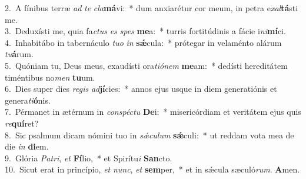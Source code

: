 {2.~}A fínibus terræ \textit{ad} \textit{te} \textit{cla}\textbf{má}vi:~* dum anxiarétur cor meum, in petra e\textit{xal}\textbf{tá}sti me.\\
{3.~}Deduxísti me, quia fa\textit{ctus} \textit{es} \textit{spes} \textbf{me}a:~* turris fortitúdinis a fácie i\textit{ni}\textbf{mí}ci.\\
{4.~}Inhabitábo in tabernáculo \textit{tu}\textit{o} \textit{in} \textbf{sǽ}cula:~* prótegar in velaménto alárum \textit{tu}\textbf{á}rum.\\
{5.~}Quóniam tu, Deus meus, exaudísti ora\textit{ti}\textit{ó}\textit{nem} \textbf{me}am:~* dedísti hereditátem timéntibus no\textit{men} \textbf{tu}um.\\
{6.~}Dies super dies \textit{re}\textit{gis} \textit{ad}\textbf{jí}cies:~* annos ejus usque in diem generatiónis et genera\textit{ti}\textbf{ó}nis.\\
{7.~}Pérmanet in ætérnum in \textit{con}\textit{spé}\textit{ctu} \textbf{De}i:~* misericórdiam et veritátem ejus quis \textit{re}\textbf{quí}ret?\\
{8.~}Sic psalmum dicam nómini tuo in \textit{sǽ}\textit{cu}\textit{lum} \textbf{sǽ}culi:~* ut reddam vota mea de die \textit{in} \textbf{di}em.\\
{9.~}Glória \textit{Pa}\textit{tri}, \textit{et} \textbf{Fí}lio,~* et Spirítu\textit{i} \textbf{San}cto.\\
{10.~}Sicut erat in princípio, \textit{et} \textit{nunc}, \textit{et} \textbf{sem}per,~* et in sǽcula sæculó\textit{rum}. \textbf{A}men.\\
